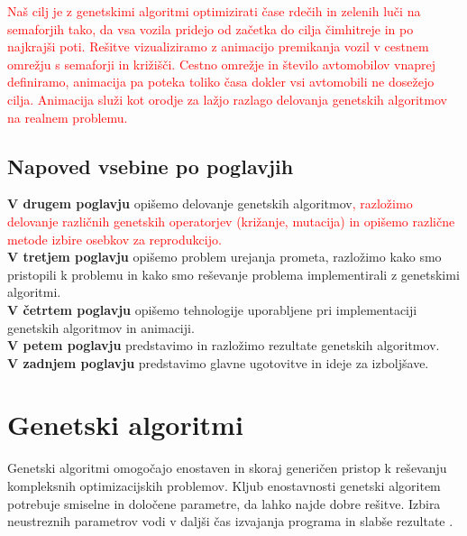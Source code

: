 \documentclass[a4paper, 12pt]{book}
\begin{document}
\textcolor{red}{Na\v s cilj je z genetskimi algoritmi optimizirati \v case rde\v cih in zelenih lu\v ci na semaforjih tako, da vsa vozila pridejo od za\v cetka do cilja \v cimhitreje in po najkraj\v si poti. Re\v sitve vizualiziramo z animacijo premikanja vozil v cestnem omre\v zju s semaforji in kri\v zi\v s\v ci. Cestno omre\v zje in \v stevilo avtomobilov vnaprej definiramo, animacija pa poteka toliko \v casa dokler vsi avtomobili ne dose\v zejo cilja. Animacija slu\v zi kot orodje za la\v zjo razlago delovanja genetskih algoritmov na realnem problemu.}

\section{Napoved vsebine po poglavjih}
\textbf{V drugem poglavju} opi\v semo delovanje genetskih algoritmov\textcolor{red}{, razlo\v zimo delovanje razli\v cnih genetskih operatorjev (kri\v zanje, mutacija) in opi\v semo razli\v cne metode izbire osebkov za reprodukcijo.}\\
\textbf{V tretjem poglavju} opi\v semo problem urejanja prometa, razlo\v zimo kako smo pristopili k problemu in kako smo re\v sevanje problema implementirali z genetskimi algoritmi.\\
\textbf{V \v cetrtem poglavju} opi\v semo tehnologije uporabljene pri implementaciji genetskih algoritmov in animaciji.\\
\textbf{V petem poglavju} predstavimo in razlo\v zimo rezultate genetskih algoritmov.\\
\textbf{V zadnjem poglavju} predstavimo glavne ugotovitve in ideje za izbolj\v save.

\chapter{Genetski algoritmi}
\label{ch1}
Genetski algoritmi omogo\v cajo enostaven in skoraj generi\v cen pristop k re\v sevanju kompleksnih optimizacijskih problemov. Kljub enostavnosti genetski algoritem potrebuje smiselne in dolo\v cene parametre, da lahko najde dobre re\v sitve. Izbira neustreznih parametrov vodi v dalj\v si \v cas izvajanja programa in slab\v se rezultate
\cite{sarmady}.
\end{document}

